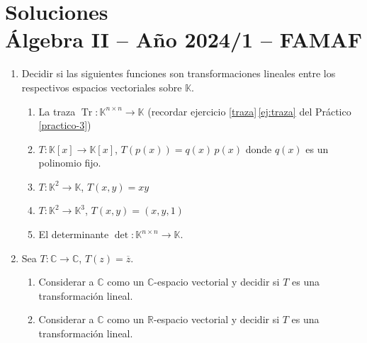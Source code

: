 
\chapter{Soluciones\\Álgebra  II -- Año 2024/1 -- FAMAF}\label{practico-7}

\begin{enumerate}[topsep=6pt, itemsep=.4cm]
    \item\label{transf-lineales-a} Decidir si las siguientes funciones son transformaciones lineales entre los respectivos espacios vectoriales sobre $\mathbb{K}$.
    \begin{enumerate}[resume, topsep=5pt,itemsep=5pt]
    \item\label{transf-lineales-b} La traza $\operatorname{Tr}:\mathbb{K}^{n\times n}\longrightarrow\mathbb{K}$ (recordar ejercicio \ref{traza}\,\ref{ej:traza} del Práctico  \ref{practico-3}) 
    \item\label{transf-lineales-} $T:\mathbb{K}[x]\longrightarrow\mathbb{K}[x]$, $T(p(x))=q(x)\,p(x)$ donde $q(x)$ es un polinomio fijo.
    \item\label{transf-lineales-c} $T:\mathbb{K}^2\longrightarrow\mathbb{K}$, $T(x,y)=xy$
    \item\label{transf-lineales-d} $T:\mathbb{K}^2\longrightarrow\mathbb{K}^3$, $T(x,y)=(x,y,1)$
    \item\label{transf-lineales-e} El determinante $\operatorname{det}:\mathbb{K}^{n\times n}\longrightarrow\mathbb{K}$.
    \end{enumerate}

    \rta
    
    
    \item Sea $T:\mathbb{C}\longrightarrow\mathbb{C}$, $T(z)=\overline{z}$.
    \begin{enumerate}
    \item\label{conj-C} Considerar a $\mathbb{C}$ como un $\mathbb{C}$-espacio vectorial y decidir si $T$ es una transformación lineal.
    \item\label{conj-R} Considerar a $\mathbb{C}$ como un $\mathbb{R}$-espacio vectorial y decidir si $T$ es una transformación lineal.
    \end{enumerate}
    
    \rta
    
    
    

\end{enumerate}

